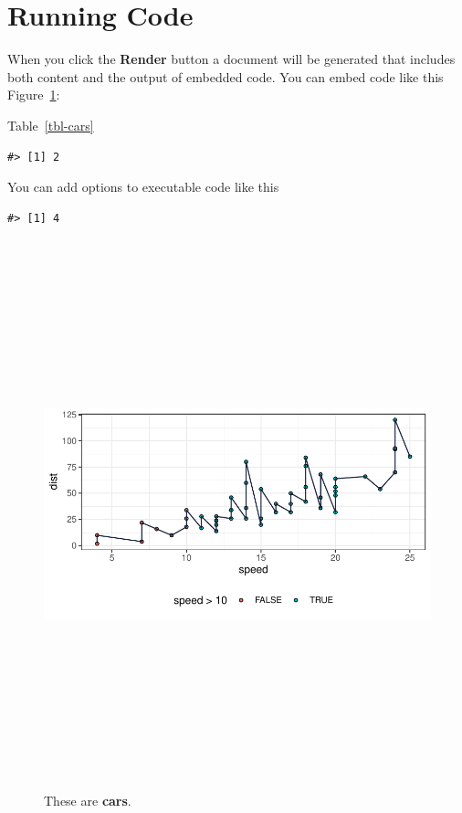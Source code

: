 \documentclass[
  authoryear]{elsarticle}
\begin{document}
\hypertarget{running-code}{%
\section{Running Code}\label{running-code}}

When you click the \textbf{Render} button a document will be generated
that includes both content and the output of embedded code. You can
embed code like this Figure~\ref{fig-cars}:

Table~\ref{tbl-cars}

\begin{verbatim}
#> [1] 2
\end{verbatim}

You can add options to executable code like this

\begin{verbatim}
#> [1] 4
\end{verbatim}

\begin{figure}

{\centering \includegraphics[width=\textwidth,height=6.25in]{doc_template_files/figure-pdf/fig-cars-1.pdf}

}

\caption{\label{fig-cars}These are \textbf{cars}.}

\end{figure}
\end{document}
